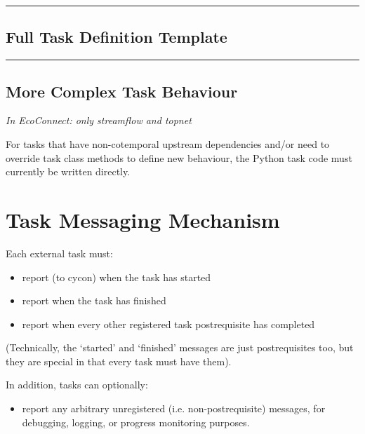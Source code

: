 \documentclass[11pt,a4paper]{article}
\begin{document}
\lstset{language=sh, numbers=left}

{\tiny
\noindent
\rule{5cm}{.2mm}

}

\subsection{Full Task Definition Template}

\lstset{language=sh, numbers=left}

{\tiny
\noindent
\rule{5cm}{.2mm}

}

\subsection{More Complex Task Behaviour}

\textit{In EcoConnect: only streamflow and topnet}

For tasks that have non-cotemporal upstream dependencies and/or need to  
override task class methods to define new behaviour, the Python task
code must currently be written directly. 

\section{Task Messaging Mechanism}

Each external task must:

\begin{itemize}
\item report (to cycon) when the task has started
\item report when the task has finished
\item report when every other registered task postrequisite has
completed
\end{itemize}

(Technically, the `started' and `finished' messages are just
postrequisites too, but they are special in that every task
must have them).

In addition, tasks can optionally:

\begin{itemize}
\item report any arbitrary unregistered (i.e. non-postrequisite)
messages, for debugging, logging, or progress monitoring purposes.
\end{itemize}
\end{document}
